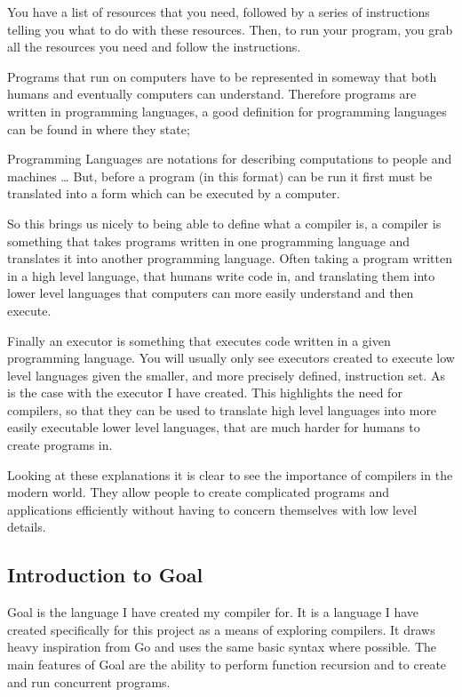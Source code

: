 You have a list of resources that you need, followed by a series of instructions telling you what to do with these resources. Then, to run your program, you grab all the resources you need and follow the instructions.

Programs that run on computers have to be represented in someway that both humans and eventually computers can understand.  Therefore programs are written in programming languages, a good definition for programming languages can be found in  \cite[p,~1]{Comp2007}  where they state;

\begin{displayquote}
Programming Languages are notations for describing computations to people and machines … But, before a program (in this format) can be run it first must be translated into a form which can be executed by a computer.
\end{displayquote}

So this brings us nicely to being able to define what a compiler is, a compiler is something that takes programs written in one programming language and translates it into another programming language. Often taking a program written in a high level language, that humans write code in, and translating them into lower level languages that computers can more easily understand and then execute.

Finally an executor is something that executes code written in a given programming language. You will usually only see executors created to execute low level languages given the smaller, and more precisely defined, instruction set. As is the case with the executor I have created. This highlights the need for compilers, so that they can be used to translate high level languages into more easily executable lower level languages, that are much harder for humans to create programs in. 

Looking at these explanations it is clear to see the importance of compilers in the modern world. They allow people to create complicated programs and applications efficiently without having to concern themselves with low level details.

\subsection{Introduction to Goal}

Goal is the language I have created my compiler for. It is a language I have created specifically for this project as a means of exploring compilers. It draws heavy inspiration from Go and uses the same basic syntax where possible. The main features of Goal are the ability to perform function recursion and to create and run concurrent programs.

